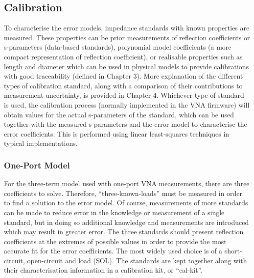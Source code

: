 \documentclass[../thesis/thesis.tex]{subfiles}
\begin{document}
\begin{refsection}
\subsection{Calibration}

To characterise the error models, impedance standards with known properties are measured. These properties can be prior measurements of reflection coefficients or s-parameters (data-based standards), polynomial model coefficients (a more compact representation of reflection coefficient), or realisable properties such as length and diameter which can be used in physical models to provide calibrations with good traceability (defined in Chapter 3). More explanation of the different types of calibration standard, along with a comparison of their contributions to measurement uncertainty, is provided in Chapter 4. Whichever type of standard is used, the calibration process (normally implemented in the VNA firmware) will obtain values for the actual s-parameters of the standard, which can be used together with the measured s-parameters and the error model to characterise the error coefficients. This is performed using linear least-squares techniques in typical implementations.

\subsubsection{One-Port Model}

For the three-term model used with one-port VNA measurements, there are three coefficients to solve. Therefore, ``three-known-loads'' must be measured in order to find a solution to the error model. Of course, measurements of more standards can be made to reduce error in the knowledge or measurement of a single standard, but in doing so additional knowledge and measurements are introduced which may result in greater error. The three standards should present reflection coefficients at the extremes of possible values in order to provide the most accurate fit for the error coefficients. The most widely used choice is of a short-circuit, open-circuit and load (SOL). The standards are kept together along with their characterisation information in a calibration kit, or ``cal-kit''.


\end{refsection}
\end{document}
